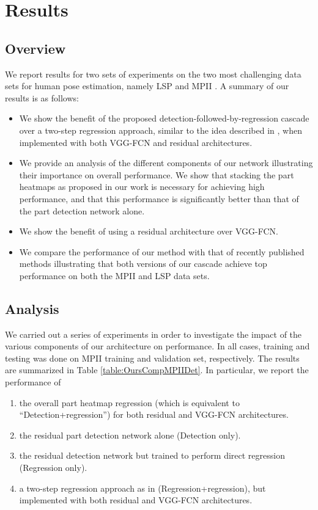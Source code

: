 \documentclass[runningheads]{llncs}
\begin{document}
\section{Results}

\subsection{Overview}

We report results for two sets of experiments on the two most challenging data sets for human pose estimation, namely LSP \cite{johnson2010clustered} and MPII \cite{andriluka20142d}. A summary of our results is as follows:

\begin{itemize}
\item
    We show the benefit of the proposed detection-followed-by-regression cascade over a two-step regression approach, similar to the idea described in \cite{pfister2015flowing}, when implemented with both VGG-FCN and residual architectures.
	\item 
    We provide an analysis of the different components of our network illustrating their importance on overall performance. We show that stacking the part heatmaps as proposed in our work is necessary for achieving high performance, and that this performance is significantly better than that of the part detection network alone.	  
      \item
    We show the benefit of using a residual architecture over VGG-FCN.
    \item   
	We compare the performance of our method with that of recently published methods illustrating that both versions of our cascade achieve top performance on both the MPII and LSP data sets.  
\end{itemize}
  
\subsection{Analysis}
\label{S:analysis}

We carried out a series of experiments in order to investigate the impact of the various components of our architecture on performance. In all cases, training and testing was done on MPII training and validation set, respectively. The results are summarized in Table \ref{table:OursCompMPIIDet}. In particular, we report the performance of 
\begin{enumerate}[i]
\item the overall part heatmap regression (which is equivalent to ``Detection+regression'') for both residual and VGG-FCN architectures.
\item
the residual part detection network alone (Detection only).
\item
the residual detection network but trained to perform direct regression (Regression only).
\item
a two-step regression approach as in \cite{pfister2015flowing} (Regression+regression), but implemented with both residual and VGG-FCN architectures.
\end{enumerate}
\end{document}
